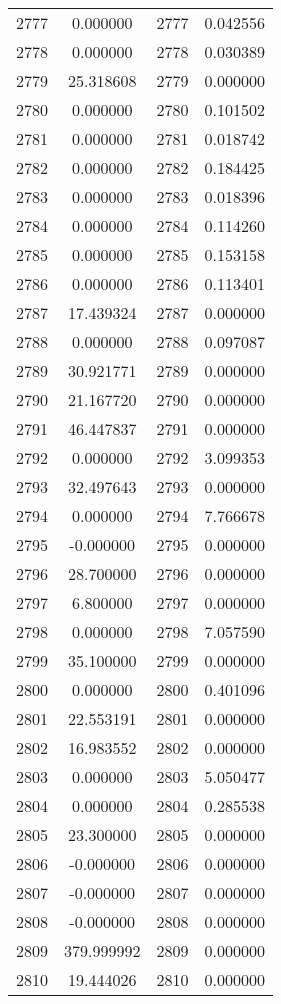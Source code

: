 \documentclass[12pt]{article}
\begin{document}
\begin{longtable}{@{}cccc@{}}
2777 & 0.000000 & 2777 & 0.042556 \\
2778 & 0.000000 & 2778 & 0.030389 \\
2779 & 25.318608 & 2779 & 0.000000 \\
2780 & 0.000000 & 2780 & 0.101502 \\
2781 & 0.000000 & 2781 & 0.018742 \\
2782 & 0.000000 & 2782 & 0.184425 \\
2783 & 0.000000 & 2783 & 0.018396 \\
2784 & 0.000000 & 2784 & 0.114260 \\
2785 & 0.000000 & 2785 & 0.153158 \\
2786 & 0.000000 & 2786 & 0.113401 \\
2787 & 17.439324 & 2787 & 0.000000 \\
2788 & 0.000000 & 2788 & 0.097087 \\
2789 & 30.921771 & 2789 & 0.000000 \\
2790 & 21.167720 & 2790 & 0.000000 \\
2791 & 46.447837 & 2791 & 0.000000 \\
2792 & 0.000000 & 2792 & 3.099353 \\
2793 & 32.497643 & 2793 & 0.000000 \\
2794 & 0.000000 & 2794 & 7.766678 \\
2795 & -0.000000 & 2795 & 0.000000 \\
2796 & 28.700000 & 2796 & 0.000000 \\
2797 & 6.800000 & 2797 & 0.000000 \\
2798 & 0.000000 & 2798 & 7.057590 \\
2799 & 35.100000 & 2799 & 0.000000 \\
2800 & 0.000000 & 2800 & 0.401096 \\
2801 & 22.553191 & 2801 & 0.000000 \\
2802 & 16.983552 & 2802 & 0.000000 \\
2803 & 0.000000 & 2803 & 5.050477 \\
2804 & 0.000000 & 2804 & 0.285538 \\
2805 & 23.300000 & 2805 & 0.000000 \\
2806 & -0.000000 & 2806 & 0.000000 \\
2807 & -0.000000 & 2807 & 0.000000 \\
2808 & -0.000000 & 2808 & 0.000000 \\
2809 & 379.999992 & 2809 & 0.000000 \\
2810 & 19.444026 & 2810 & 0.000000 \\

\end{longtable}
\end{document}
